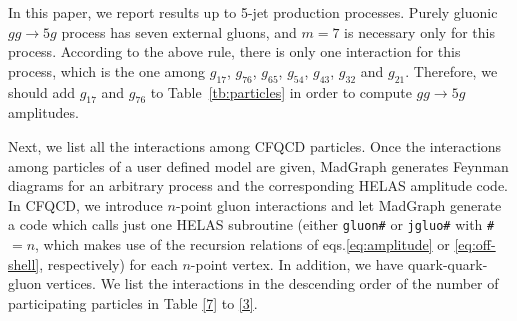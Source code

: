 \documentclass[a4paper,11pt]{article}
\begin{document}
In this paper, we report results up to 5-jet production
processes. Purely gluonic $gg\rightarrow  5g$ process has seven external
gluons, and $m=7$ is necessary only for this process. According to the
above rule, there is only one interaction for this process, which is
the one among $g_{17}$,
$g_{76}$, $g_{65}$, $g_{54}$, $g_{43}$, $g_{32}$ and
$g_{21}$. Therefore, we should
 add $g_{17}$ and $g_{76}$ to Table~\ref{tb:particles} in order to
 compute $gg\rightarrow 5g$ amplitudes.

Next, we list all the interactions among CFQCD particles. Once the
 interactions
 among particles of a
user defined model are given, MadGraph generates Feynman diagrams for an arbitrary
process and the corresponding HELAS amplitude code. In CFQCD, we
introduce $n$-point gluon interactions and let MadGraph
generate a code which calls just one HELAS subroutine (either {\tt gluon\#}
or {\tt jgluo\#} with {\tt \#} $=n$, which makes use of the recursion relations of
eqs.\eqref{eq:amplitude} or \eqref{eq:off-shell}, respectively) for each
 $n$-point vertex. In addition, we have
 quark-quark-gluon vertices. We list the interactions in the descending order of the
 number of participating particles in Table \ref{7} to \ref{3}.
\end{document}
